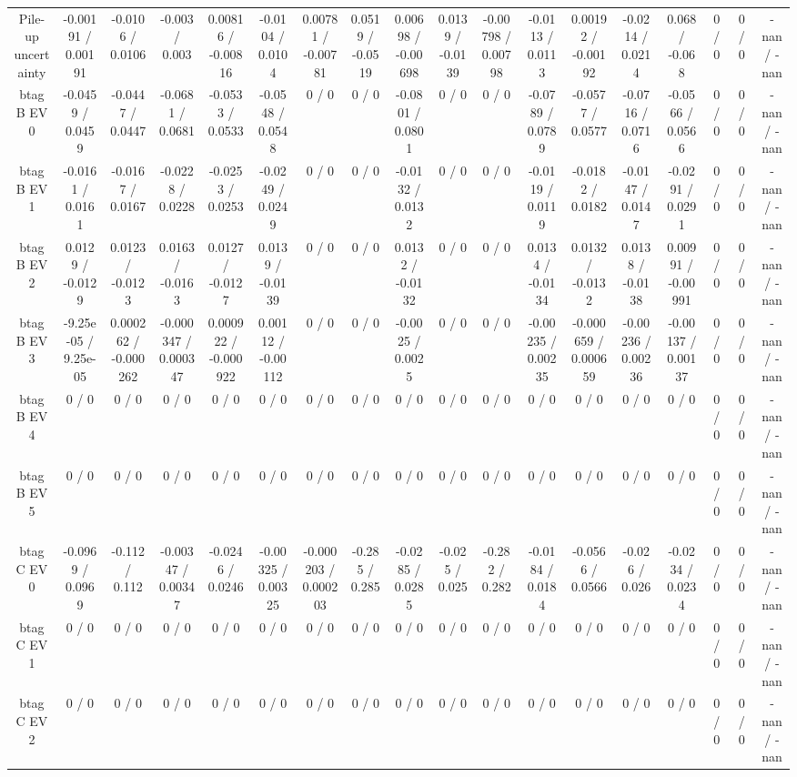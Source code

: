 \documentclass[10pt]{article}
\begin{document}
\begin{table}[htbp]
\begin{center}
\begin{tabular}{|c|c|c|c|c|c|c|c|c|c|c|c|c|c|c|c|c|c|}
  Pile-up uncertainty & -0.00191 / 0.00191 & -0.0106 / 0.0106 & -0.003 / 0.003 & 0.00816 / -0.00816 & -0.0104 / 0.0104 & 0.00781 / -0.00781 & 0.0519 / -0.0519 & 0.00698 / -0.00698 & 0.0139 / -0.0139 & -0.00798 / 0.00798 & -0.0113 / 0.0113 & 0.00192 / -0.00192 & -0.0214 / 0.0214 & 0.068 / -0.068 & 0 / 0 & 0 / 0 & -nan / -nan \\ 
  btag B EV 0 & -0.0459 / 0.0459 & -0.0447 / 0.0447 & -0.0681 / 0.0681 & -0.0533 / 0.0533 & -0.0548 / 0.0548 & 0 / 0 & 0 / 0 & -0.0801 / 0.0801 & 0 / 0 & 0 / 0 & -0.0789 / 0.0789 & -0.0577 / 0.0577 & -0.0716 / 0.0716 & -0.0566 / 0.0566 & 0 / 0 & 0 / 0 & -nan / -nan \\ 
  btag B EV 1 & -0.0161 / 0.0161 & -0.0167 / 0.0167 & -0.0228 / 0.0228 & -0.0253 / 0.0253 & -0.0249 / 0.0249 & 0 / 0 & 0 / 0 & -0.0132 / 0.0132 & 0 / 0 & 0 / 0 & -0.0119 / 0.0119 & -0.0182 / 0.0182 & -0.0147 / 0.0147 & -0.0291 / 0.0291 & 0 / 0 & 0 / 0 & -nan / -nan \\ 
  btag B EV 2 & 0.0129 / -0.0129 & 0.0123 / -0.0123 & 0.0163 / -0.0163 & 0.0127 / -0.0127 & 0.0139 / -0.0139 & 0 / 0 & 0 / 0 & 0.0132 / -0.0132 & 0 / 0 & 0 / 0 & 0.0134 / -0.0134 & 0.0132 / -0.0132 & 0.0138 / -0.0138 & 0.00991 / -0.00991 & 0 / 0 & 0 / 0 & -nan / -nan \\ 
  btag B EV 3 & -9.25e-05 / 9.25e-05 & 0.000262 / -0.000262 & -0.000347 / 0.000347 & 0.000922 / -0.000922 & 0.00112 / -0.00112 & 0 / 0 & 0 / 0 & -0.0025 / 0.0025 & 0 / 0 & 0 / 0 & -0.00235 / 0.00235 & -0.000659 / 0.000659 & -0.00236 / 0.00236 & -0.00137 / 0.00137 & 0 / 0 & 0 / 0 & -nan / -nan \\ 
  btag B EV 4 & 0 / 0 & 0 / 0 & 0 / 0 & 0 / 0 & 0 / 0 & 0 / 0 & 0 / 0 & 0 / 0 & 0 / 0 & 0 / 0 & 0 / 0 & 0 / 0 & 0 / 0 & 0 / 0 & 0 / 0 & 0 / 0 & -nan / -nan \\ 
  btag B EV 5 & 0 / 0 & 0 / 0 & 0 / 0 & 0 / 0 & 0 / 0 & 0 / 0 & 0 / 0 & 0 / 0 & 0 / 0 & 0 / 0 & 0 / 0 & 0 / 0 & 0 / 0 & 0 / 0 & 0 / 0 & 0 / 0 & -nan / -nan \\ 
  btag C EV 0 & -0.0969 / 0.0969 & -0.112 / 0.112 & -0.00347 / 0.00347 & -0.0246 / 0.0246 & -0.00325 / 0.00325 & -0.000203 / 0.000203 & -0.285 / 0.285 & -0.0285 / 0.0285 & -0.025 / 0.025 & -0.282 / 0.282 & -0.0184 / 0.0184 & -0.0566 / 0.0566 & -0.026 / 0.026 & -0.0234 / 0.0234 & 0 / 0 & 0 / 0 & -nan / -nan \\ 
  btag C EV 1 & 0 / 0 & 0 / 0 & 0 / 0 & 0 / 0 & 0 / 0 & 0 / 0 & 0 / 0 & 0 / 0 & 0 / 0 & 0 / 0 & 0 / 0 & 0 / 0 & 0 / 0 & 0 / 0 & 0 / 0 & 0 / 0 & -nan / -nan \\ 
  btag C EV 2 & 0 / 0 & 0 / 0 & 0 / 0 & 0 / 0 & 0 / 0 & 0 / 0 & 0 / 0 & 0 / 0 & 0 / 0 & 0 / 0 & 0 / 0 & 0 / 0 & 0 / 0 & 0 / 0 & 0 / 0 & 0 / 0 & -nan / -nan \\ 

\end{tabular}
\end{center}
\end{table}
\end{document}
